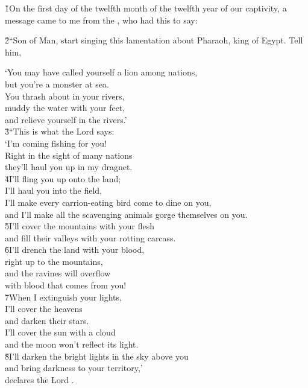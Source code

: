 \v{1}On the first day of the twelfth month of the twelfth year of our captivity, a message came to me from the , who had this to say:

\v{2}``Son of Man, start singing this lamentation about Pharaoh, king of Egypt. Tell him,

\begin{poetry}
\poeml `You may have called yourself a lion among nations, \\
\poemll    but you're a monster at sea. \\
\poeml You thrash about in your rivers, \\
\poemll    muddy the water with your feet, \\
\poemlll       and relieve yourself in the rivers.' \\
\poeml \v{3}``This is what the Lord  says: \\
\poemll    `I'm coming fishing for you! \\
\poeml Right in the sight of many nations \\
\poemll    they'll haul you up in my dragnet. \\
\poeml \v{4}I'll fling you up onto the land; \\
\poemll    I'll haul you into the field, \\
\poeml I'll make every carrion-eating bird come to dine on you, \\
\poemll    and I'll make all the scavenging animals gorge themselves on you. \\
\poeml \v{5}I'll cover the mountains with your flesh \\
\poemll    and fill their valleys with your rotting carcass. \\
\poeml \v{6}I'll drench the land with your blood, \\
\poemll    right up to the mountains, \\
\poeml and the ravines will overflow \\
\poemll    with blood that comes from you! \\
\poeml \v{7}When I extinguish your lights, \\
\poemll    I'll cover the heavens \\
\poemlll       and darken their stars. \\
\poeml I'll cover the sun with a cloud \\
\poemll    and the moon won't reflect its light. \\
\poeml \v{8}I'll darken the bright lights in the sky above you \\
\poemll    and bring darkness to your territory,' \\
\poemlll       declares the Lord .
\end{poetry}

